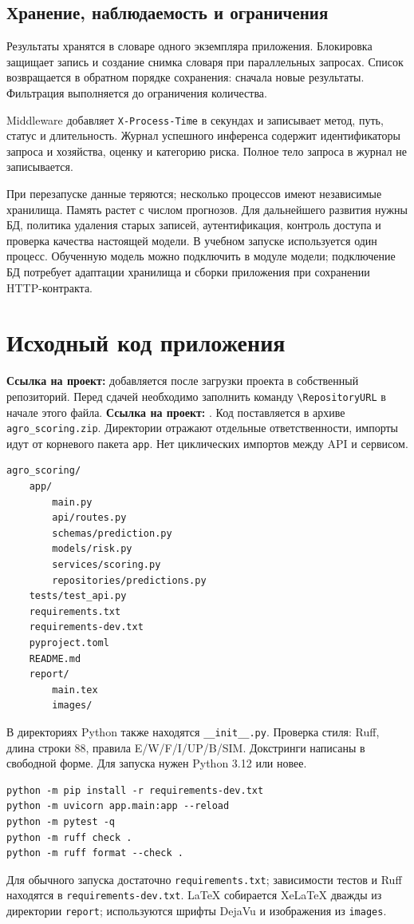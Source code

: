 \documentclass[12pt,a4paper]{article}
\newcommand{\RepositoryURL}{}
\begin{document}
\subsection{Хранение, наблюдаемость и ограничения}
Результаты хранятся в словаре одного экземпляра приложения. Блокировка защищает запись и создание снимка словаря при параллельных запросах. Список возвращается в обратном порядке сохранения: сначала новые результаты. Фильтрация выполняется до ограничения количества.

Middleware добавляет \texttt{X-Process-Time} в секундах и записывает метод, путь, статус и длительность. Журнал успешного инференса содержит идентификаторы запроса и хозяйства, оценку и категорию риска. Полное тело запроса в журнал не записывается.

При перезапуске данные теряются; несколько процессов имеют независимые хранилища. Память растет с числом прогнозов. Для дальнейшего развития нужны БД, политика удаления старых записей, аутентификация, контроль доступа и проверка качества настоящей модели. В учебном запуске используется один процесс. Обученную модель можно подключить в модуле модели; подключение БД потребует адаптации хранилища и сборки приложения при сохранении HTTP-контракта.

\section{Исходный код приложения}
\if\relax\detokenize\expandafter{\RepositoryURL}\relax
\textbf{Ссылка на проект:} добавляется после загрузки проекта в собственный репозиторий. Перед сдачей необходимо заполнить команду \texttt{\textbackslash RepositoryURL} в начале этого файла.
\else
\textbf{Ссылка на проект:} \expandafter\url\expandafter{\RepositoryURL}.
\fi
Код поставляется в архиве \texttt{agro\_scoring.zip}. Директории отражают отдельные ответственности, импорты идут от корневого пакета \texttt{app}. Нет циклических импортов между API и сервисом.
\begin{lstlisting}[language={},caption={Структура проекта}]
agro_scoring/
    app/
        main.py
        api/routes.py
        schemas/prediction.py
        models/risk.py
        services/scoring.py
        repositories/predictions.py
    tests/test_api.py
    requirements.txt
    requirements-dev.txt
    pyproject.toml
    README.md
    report/
        main.tex
        images/
\end{lstlisting}
В директориях Python также находятся \texttt{\_\_init\_\_.py}. Проверка стиля: Ruff, длина строки 88, правила E/W/F/I/UP/B/SIM. Докстринги написаны в свободной форме. Для запуска нужен Python 3.12 или новее.
\begin{lstlisting}[language={},caption={Установка, запуск и проверка из корня проекта}]
python -m pip install -r requirements-dev.txt
python -m uvicorn app.main:app --reload
python -m pytest -q
python -m ruff check .
python -m ruff format --check .
\end{lstlisting}
Для обычного запуска достаточно \texttt{requirements.txt}; зависимости тестов и Ruff находятся в \texttt{requirements-dev.txt}. LaTeX собирается XeLaTeX дважды из директории \texttt{report}; используются шрифты DejaVu и изображения из \texttt{images}.
\end{document}

